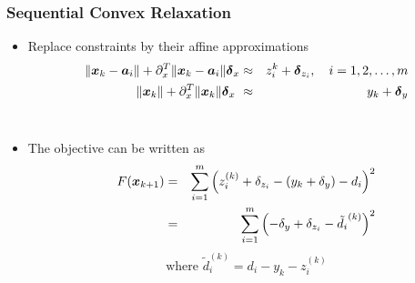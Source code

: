 \documentclass [t] {beamer} %
\begin{document}
\begin{frame} %
\frametitle{Sequential Convex Relaxation}
\phantom{m}
\begin{itemize}
\item
Replace constraints by their affine approximations
\setcounter{abc}{0}
\begin{eqnarray}
\nonumber
\|\mbox{\boldmath$x$}_{k} - \mbox{\boldmath$a$}_i\| + \partial_x^T\|\mbox{\boldmath$x$}_{k} - \mbox{\boldmath$a$}_i\|\mbox{\boldmath${\delta}$}_x &\approx & z_i^{k} + \mbox{\boldmath${\delta}$}_{z_i}, \quad i = 1, 2, \ldots, m \\
\nonumber
\|\mbox{\boldmath$x$}_{k}\|  + \partial_x^T\|\mbox{\boldmath$x$}_{k}\|\mbox{\boldmath${\delta}$}_x\ &\approx & y_{k}  + \mbox{\boldmath${\delta}$}_y
\end{eqnarray}
\\
\item
The objective  can be written as
\begin{eqnarray} 
\nonumber
F(\mbox{\boldmath$x$}_{k+1}) & =  & \sum^m_{i = 1} \left(z^{(k)}_i + \delta_{z_i} - (y_k + \delta_y) - d_i \right)^2 \\
\nonumber
& = & \sum^m_{i = 1} \left(- \delta_y + \delta_{z_i}  - \tilde{d_i}^{(k)} \right)^2
\end{eqnarray}
\begin{equation}
\nonumber
\mbox{where   } \tilde{d}^{(k)}_i =  d_i - y_k - z_i^{(k)}
\end{equation}

\end{itemize}
\end{frame}
\end{document}
